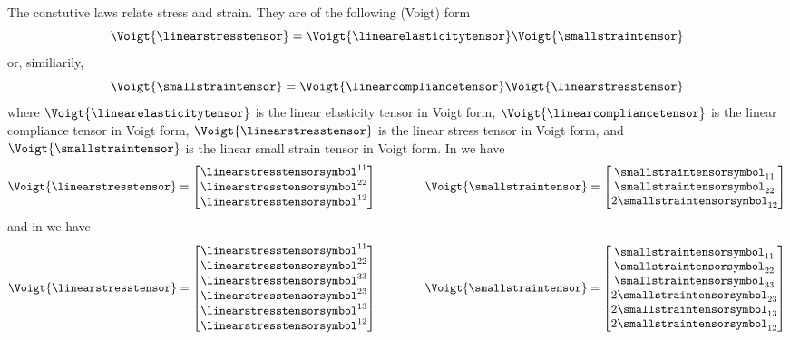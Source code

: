 The constutive laws relate stress and strain. They are of the following (Voigt) form
\begin{equation}
  \Voigt{\linearstresstensor}=\Voigt{\linearelasticitytensor}\Voigt{\smallstraintensor}
\end{equation}
or, similiarily,
\begin{equation} 
  \Voigt{\smallstraintensor}=\Voigt{\linearcompliancetensor}\Voigt{\linearstresstensor}
\end{equation}
where $\Voigt{\linearelasticitytensor}$ is the linear elasticity tensor in Voigt form, $\Voigt{\linearcompliancetensor}$ is the linear compliance tensor in Voigt form, $\Voigt{\linearstresstensor}$ is the linear stress tensor in Voigt form, and $\Voigt{\smallstraintensor}$ is the linear small strain tensor in Voigt form. In \twods we have
\begin{equation}
  \Voigt{\linearstresstensor}=\begin{bmatrix}
  \linearstresstensorsymbol^{11} \\
  \linearstresstensorsymbol^{22} \\
  \linearstresstensorsymbol^{12}
  \end{bmatrix}\qquad\qquad\Voigt{\smallstraintensor}=\begin{bmatrix}
  \smallstraintensorsymbol_{11} \\
  \smallstraintensorsymbol_{22} \\
  2\smallstraintensorsymbol_{12}
  \end{bmatrix}
\end{equation}
and in \threeds we have
\begin{equation}
  \Voigt{\linearstresstensor}=\begin{bmatrix}
  \linearstresstensorsymbol^{11} \\
  \linearstresstensorsymbol^{22} \\
  \linearstresstensorsymbol^{33} \\
  \linearstresstensorsymbol^{23} \\
  \linearstresstensorsymbol^{13} \\
  \linearstresstensorsymbol^{12}
  \end{bmatrix}\qquad\qquad\Voigt{\smallstraintensor}=\begin{bmatrix}
  \smallstraintensorsymbol_{11} \\
  \smallstraintensorsymbol_{22} \\
  \smallstraintensorsymbol_{33} \\
  2\smallstraintensorsymbol_{23} \\
  2\smallstraintensorsymbol_{13} \\
  2\smallstraintensorsymbol_{12}
  \end{bmatrix}
\end{equation}


